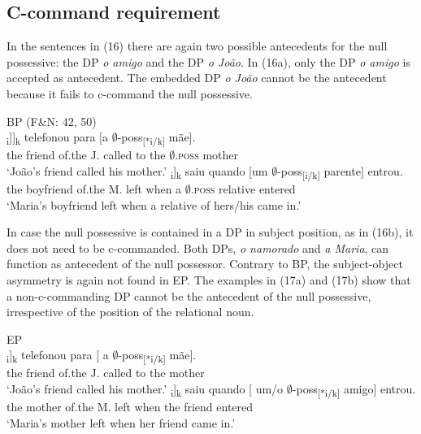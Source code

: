 \documentclass[output=paper]{langsci/langscibook}
\begin{document}
\subsection{C-command requirement}%

In the sentences in (16) there are again two possible antecedents for the null possessive: the DP \textit{o amigo} and the DP \textit{o João}. In (16a), only the DP \textit{o amigo} is accepted as antecedent. The embedded DP \textit{o João} cannot be the antecedent because it fails to c-command the null possessive.

\ea%
    BP (F\&N: 42, 50)\label{ex:wein:16}\\
    \ea
    \gll\relax [O amigo [d[o João]\textsubscript{i}]]\textsubscript{k} telefonou para [a $\emptyset$-poss\textsubscript{[}\textsubscript{*i/k]} mãe].\\
         the friend of.the J. called to the $\emptyset$\textsc{.poss} mother\\
    \glt ‘João’s friend called his mother.’
    \ex  
    \gll\relax [O namorado d[a Maria]\textsubscript{i}]\textsubscript{k} saiu quando [um $\emptyset$-poss\textsubscript{[i/}\textsubscript{k]} parente] entrou.\\
         the boyfriend of.the M. left when a $\emptyset$\textsc{.poss} relative entered\\
    \glt ‘Maria’s boyfriend left when a relative of hers/his came in.’
    \z
\z

In case the null possessive is contained in a DP in subject position, as in (16b), it does not need to be c-commanded. Both DPs, \textit{o namorado} and \textit{a Maria}, can function as antecedent of the null possessor. Contrary to BP, the subject-object asymmetry is again not found in EP. The examples in (17a) and (17b) show that a non-c-commanding DP cannot be the antecedent of the null possessive, irrespective of the position of the relational noun.

\ea%
    EP\label{ex:wein:17}\\
    \ea
    \gll [ O amigo d[o João]\textsubscript{i}]\textsubscript{k} telefonou para [ a $\emptyset$-poss\textsubscript{[*}\textsubscript{i/k]} mãe].\\
         {} the friend of.the J. called to {} the {} mother\\
    \glt ‘João’s friend called his mother.’
    \ex  
    \gll [ A mãe d[a Maria]\textsubscript{i}]\textsubscript{k} saiu quando [ um/o $\emptyset$-poss\textsubscript{[*i/k]} amigo] entrou. \\
         {} the mother of.the M. left when {} the {} friend entered \\
    \glt ‘Maria’s mother left when her friend came in.’ 
    \z
\z
\end{document}

